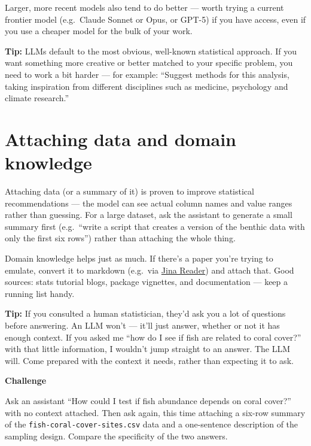 \documentclass[
  letterpaper,
  DIV=11,
  numbers=noendperiod]{scrreprt}
\begin{document}
Larger, more recent models also tend to do better --- worth trying a
current frontier model (e.g.~Claude Sonnet or Opus, or GPT-5) if you
have access, even if you use a cheaper model for the bulk of your work.

\textbf{Tip:} LLMs default to the most obvious, well-known statistical
approach. If you want something more creative or better matched to your
specific problem, you need to work a bit harder --- for example:
``Suggest methods for this analysis, taking inspiration from different
disciplines such as medicine, psychology and climate research.''

\section{Attaching data and domain
knowledge}\label{attaching-data-and-domain-knowledge}

Attaching data (or a summary of it) is proven to improve statistical
recommendations --- the model can see actual column names and value
ranges rather than guessing. For a large dataset, ask the assistant to
generate a small summary first (e.g.~``write a script that creates a
version of the benthic data with only the first six rows'') rather than
attaching the whole thing.

Domain knowledge helps just as much. If there's a paper you're trying to
emulate, convert it to markdown (e.g.~via
\href{https://tools.simonwillison.net/jina-reader}{Jina Reader}) and
attach that. Good sources: stats tutorial blogs, package vignettes, and
documentation --- keep a running list handy.

\textbf{Tip:} If you consulted a human statistician, they'd ask you a
lot of questions before answering. An LLM won't --- it'll just answer,
whether or not it has enough context. If you asked me ``how do I see if
fish are related to coral cover?'' with that little information, I
wouldn't jump straight to an answer. The LLM will. Come prepared with
the context it needs, rather than expecting it to ask.

\begin{tcolorbox}[enhanced jigsaw, toprule=.15mm, rightrule=.15mm, left=2mm, leftrule=.75mm, breakable, opacityback=0, arc=.35mm, colframe=quarto-callout-important-color-frame, bottomrule=.15mm, colback=white]
\begin{minipage}[t]{5.5mm}
\textcolor{quarto-callout-important-color}{\faExclamation}
\end{minipage}%
\begin{minipage}[t]{\textwidth - 5.5mm}

\vspace{-3mm}\textbf{Challenge}\vspace{3mm}

Ask an assistant ``How could I test if fish abundance depends on coral
cover?'' with no context attached. Then ask again, this time attaching a
six-row summary of the \texttt{fish-coral-cover-sites.csv} data and a
one-sentence description of the sampling design. Compare the specificity
of the two answers.

\end{minipage}%
\end{tcolorbox}
\end{document}
